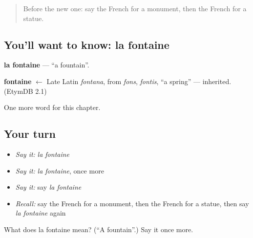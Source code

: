 \begin{quote}
Before the new one: say the French for a monument, then the French for a statue.
\end{quote}

\subsection*{You'll want to know: la fontaine}
\textbf{la fontaine} — \textquotedblleft{}a fountain\textquotedblright{}.

\begin{cousinweb}
\textbf{fontaine} $\leftarrow$ Late Latin \emph{fontana}, from \emph{fons}, \emph{fontis}, \textquotedblleft{}a spring\textquotedblright{} — inherited. (EtymDB 2.1)
\end{cousinweb}

\begin{grammarlens}[title={What you've built}]
One more word for this chapter.
\end{grammarlens}

\subsection*{Your turn}
\begin{itemize}
\raggedright
  \item \emph{Say it:} \emph{la fontaine}
  \item \emph{Say it:} \emph{la fontaine}, once more
  \item \emph{Say it:} say \emph{la fontaine}
  \item \emph{Recall:} say the French for a monument, then the French for a statue, then say \emph{la fontaine} again
\end{itemize}

\begin{tcolorbox}[breakable,colback=teal!4,colframe=teal!35!black,title={Before you move on}]
What does la fontaine mean? (\textquotedblleft{}A fountain\textquotedblright{}.) Say it once more.
\end{tcolorbox}
